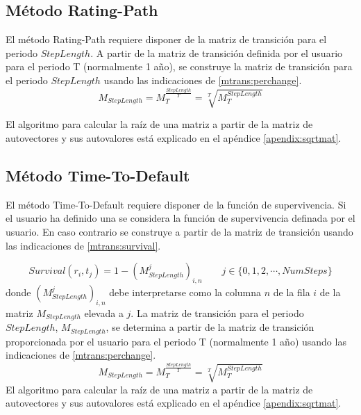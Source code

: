 \subsection{M\'etodo Rating-Path}

El m\'etodo Rating-Path requiere disponer de la matriz de transici\'on
para el periodo $StepLength$. A partir de la matriz de transici\'on
definida por el usuario para el periodo T (normalmente 1 a\~no), se
construye la matriz de transici\'on para el periodo $StepLength$ usando
las indicaciones de \ref{mtrans:perchange}.
\begin{displaymath}
M_{StepLength} = M_{T}^{\frac{StepLength}{T}} = \sqrt[T]{M_{T}^{StepLength}}
\end{displaymath}

El algoritmo para calcular la ra\'iz de una matriz a partir de la matriz
de autovectores y sus autovalores est\'a explicado en el ap\'endice
\ref{apendix:sqrtmat}.

\subsection{M\'etodo Time-To-Default}

El m\'etodo Time-To-Default requiere disponer de la funci\'on de
supervivencia. Si el usuario ha definido una se considera la
funci\'on de supervivencia definada por el usuario. En caso
contrario se construye a partir de la matriz de transici\'on
usando las indicaciones de \ref{mtrans:survival}.

\begin{displaymath}
Survival(r_i,t_j) = 1 - (M_{StepLength}^j)_{i,n} \qquad j \in \{0,1,2,\cdots,NumSteps\}
\end{displaymath}
donde $(M_{StepLength}^j)_{i,n}$ debe interpretarse como la columna $n$ de
la fila $i$ de la matriz $M_{StepLength}$ elevada a $j$. La matriz de transici\'on
para el periodo $StepLength$, $M_{StepLength}$, se determina a partir de la matriz
de transici\'on proporcionada por el usuario para el periodo T (normalmente 1 a\~no)
usando las indicaciones de \ref{mtrans:perchange}.
\begin{displaymath}
M_{StepLength} = M_{T}^{\frac{StepLength}{T}} = \sqrt[T]{M_{T}^{StepLength}}
\end{displaymath}
El algoritmo para calcular la ra\'iz de una matriz a partir de la matriz
de autovectores y sus autovalores est\'a explicado en el ap\'endice
\ref{apendix:sqrtmat}.


